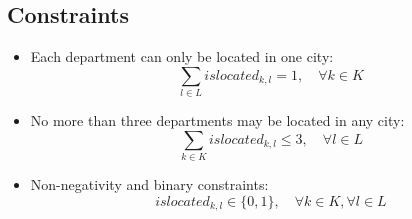 \documentclass{article}
\begin{document}
\subsection*{Constraints}
\begin{itemize}
    \item Each department can only be located in one city:
    \[
    \sum_{l \in L} islocated_{k, l} = 1, \quad \forall k \in K
    \]
    
    \item No more than three departments may be located in any city:
    \[
    \sum_{k \in K} islocated_{k, l} \leq 3, \quad \forall l \in L
    \]

    \item Non-negativity and binary constraints:
    \[
    islocated_{k, l} \in \{0, 1\}, \quad \forall k \in K, \forall l \in L
    \]
\end{itemize}
\end{document}
